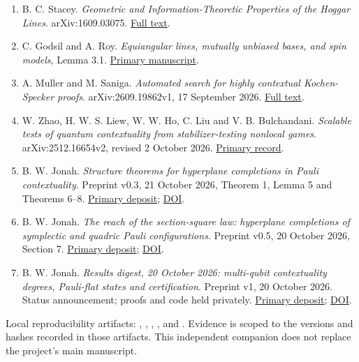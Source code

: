 \documentclass[11pt,letterpaper]{article}
\begin{document}
\begin{enumerate}
\item
  B. C. Stacey. \emph{Geometric and Information-Theoretic Properties of the Hoggar Lines}. arXiv:1609.03075. \href{https://arxiv.org/html/1609.03075v1}{Full text}.
\item
  C. Godsil and A. Roy. \emph{Equiangular lines, mutually unbiased bases, and spin models}, Lemma 3.1. \href{https://arxiv.org/pdf/quant-ph/0511004}{Primary manuscript}.
\item
  A. Muller and M. Saniga. \emph{Automated search for highly contextual Kochen-Specker proofs}. arXiv:2609.19862v1, 17 September 2026. \href{https://arxiv.org/html/2609.19862v1}{Full text}.
\item
  W. Zhao, H. W. S. Liew, W. W. Ho, C. Liu and V. B. Bulchandani. \emph{Scalable tests of quantum contextuality from stabilizer-testing nonlocal games}. arXiv:2512.16654v2, revised 2 October 2026. \href{https://arxiv.org/abs/2512.16654}{Primary record}.
\item
  B. W. Jonah. \emph{Structure theorems for hyperplane completions in Pauli contextuality}. Preprint v0.3, 21 October 2026, Theorem 1, Lemma 5 and Theorems 6--8. \href{https://zenodo.org/records/23538829}{Primary deposit}; \href{https://doi.org/10.5281/zenodo.23538829}{DOI}.
\item
  B. W. Jonah. \emph{The reach of the section-square law: hyperplane completions of symplectic and quadric Pauli configurations}. Preprint v0.5, 20 October 2026, Section 7. \href{https://zenodo.org/records/23524332}{Primary deposit}; \href{https://doi.org/10.5281/zenodo.23524332}{DOI}.
\item
  B. W. Jonah. \emph{Results digest, 20 October 2026: multi-qubit contextuality degrees, Pauli-flat states and certification}. Preprint v1, 20 October 2026. Status announcement; proofs and code held privately. \href{https://zenodo.org/records/23518569}{Primary deposit}; \href{https://doi.org/10.5281/zenodo.23518569}{DOI}.
\end{enumerate}

Local reproducibility artifacts: , , , , and . Evidence is scoped to the versions and hashes recorded in those artifacts. This independent companion does not replace the project's main manuscript.
\end{document}
